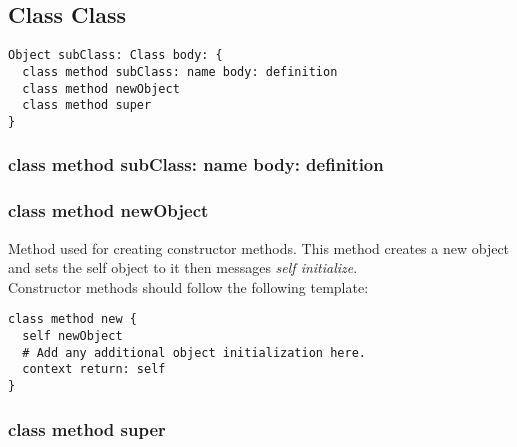 \subsection{Class Class}

\begin{lstlisting}
Object subClass: Class body: {
  class method subClass: name body: definition
  class method newObject
  class method super
}
\end{lstlisting}

\subsubsection{class method subClass: name body: definition}


\subsubsection{class method newObject}
Method used for creating constructor methods. This method creates a new
object and sets the self object to it then messages \textit{self initialize}.\\
Constructor methods should follow the following template:

\begin{lstlisting}
class method new {
  self newObject
  # Add any additional object initialization here.
  context return: self
}
\end{lstlisting}

\subsubsection{class method super}
